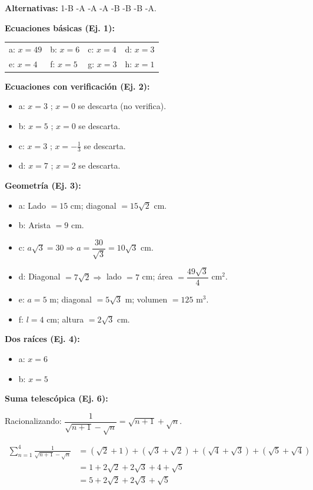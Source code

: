 \documentclass[11pt, letterpaper]{article}
\begin{document}
\begin{tcolorbox}[answerbox, title={Respuestas}]
\textbf{Alternativas:} 1-B -A -A -A -B -B -B -A.

\medskip
\textbf{Ecuaciones básicas (Ej. 1):}

\begin{center}
\renewcommand{\arraystretch}{1.25}
\begin{tabular}{llll}
a: $x=49$ & b: $x=6$ & c: $x=4$ & d: $x=3$\\
e: $x=4$ & f: $x=5$ & g: $x=3$ & h: $x=1$
\end{tabular}
\end{center}

\medskip
\textbf{Ecuaciones con verificación (Ej. 2):}

\begin{itemize}[itemsep=2pt]
  \item a: $x=3$ \checkmark; $x=0$ se descarta (no verifica).
  \item b: $x=5$ \checkmark; $x=0$ se descarta.
  \item c: $x=3$ \checkmark; $x=-\tfrac{1}{3}$ se descarta.
  \item d: $x=7$ \checkmark; $x=2$ se descarta.
\end{itemize}

\medskip
\textbf{Geometría (Ej. 3):}

\begin{itemize}[itemsep=2pt]
  \item a: Lado $=15$ cm; diagonal $=15\sqrt{2}$ cm.
  \item b: Arista $=9$ cm.
  \item c: $a\sqrt{3}=30 \Rightarrow a = \dfrac{30}{\sqrt{3}} = 10\sqrt{3}$ cm.
  \item d: Diagonal $=7\sqrt{2} \Rightarrow$ lado $=7$ cm; área $=\dfrac{49\sqrt{3}}{4}$ cm$^2$.
  \item e: $a=5$ m; diagonal $=5\sqrt{3}$ m; volumen $=125$ m$^3$.
  \item f: $l=4$ cm; altura $=2\sqrt{3}$ cm.
\end{itemize}

\medskip
\textbf{Dos raíces (Ej. 4):}

\begin{itemize}[itemsep=2pt]
  \item a: $x=6$ \checkmark
  \item b: $x=5$ \checkmark
\end{itemize}

\medskip
\textbf{Suma telescópica (Ej. 6):}

Racionalizando: $\dfrac{1}{\sqrt{n+1}-\sqrt{n}} = \sqrt{n+1}+\sqrt{n}$.

\begin{align*}
\sum_{n=1}^{4}\frac{1}{\sqrt{n+1}-\sqrt{n}}
&= (\sqrt{2}+1)+(\sqrt{3}+\sqrt{2})+(\sqrt{4}+\sqrt{3})+(\sqrt{5}+\sqrt{4})\\
&= 1 + 2\sqrt{2} + 2\sqrt{3} + 4 + \sqrt{5}\\
&= 5 + 2\sqrt{2} + 2\sqrt{3} + \sqrt{5}
\end{align*}
\end{tcolorbox}
\end{document}

